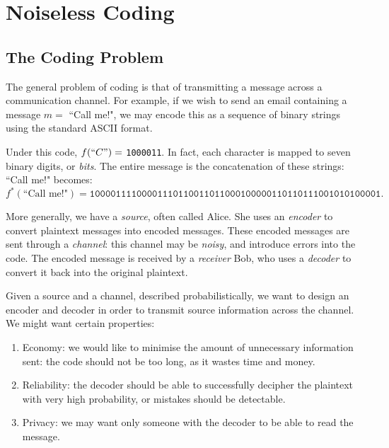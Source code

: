 \documentclass{article}
\begin{document}
\makecover

\section{Noiseless Coding}
\subsection{The Coding Problem}
\label{section-noiseless-coding-problem}

The general problem of coding is that of
transmitting a message across a communication channel.
For example, if we wish to send an email containing a message $m =$ ``Call me!",
we may encode this as a sequence of binary strings using the standard ASCII format.

Under this code, $f(``C") =$ \texttt{1000011}.
In fact, each character is mapped to seven binary digits, or \textit{bits}.
The entire message is the concatenation of these strings: ``Call me!" becomes:
\[
f^*(\text{``Call me!"}) = 
\texttt{10000111100001110110011011000100000110110111001010100001}.
\]

\begin{definition}
    \label{source-encoder-channel-receiver-decoder}
    More generally, we have a \textit{source}, often called Alice.
    She uses an \textit{encoder} to convert plaintext messages into encoded messages.
    These encoded messages are sent through a \textit{channel}:
    this channel may be \textit{noisy}, and introduce errors into the code.
    The encoded message is received by a \textit{receiver} Bob,
    who uses a \textit{decoder} to convert it back into the original plaintext.
\end{definition}

Given a source and a channel, described probabilistically, we want to design an encoder and decoder in order to transmit source information across the channel. We might want certain properties:

\begin{enumerate}
    \item Economy: we would like to minimise the amount of unnecessary information sent: the code should not be too long, as it wastes time and money.
    \item Reliability: the decoder should be able to successfully decipher the plaintext with very high probability, or mistakes should be detectable.
    \item Privacy: we may want only someone with the decoder to be able to read the message.
\end{enumerate}
\end{document}
